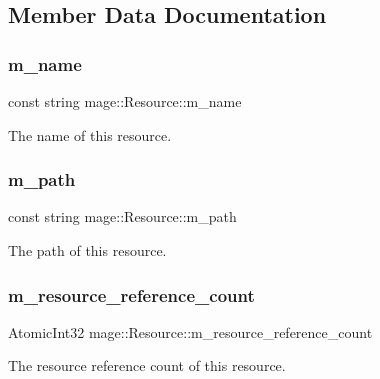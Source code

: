\subsection{Member Data Documentation}
\hypertarget{classmage_1_1_resource_a93019b74e9665195f1af17c60b6d171a}{}\label{classmage_1_1_resource_a93019b74e9665195f1af17c60b6d171a} 
\subsubsection{\texorpdfstring{m\+\_\+name}{m\_name}}
{\footnotesize\ttfamily const string mage\+::\+Resource\+::m\+\_\+name\hspace{0.3cm}{\ttfamily [private]}}

The name of this resource. \hypertarget{classmage_1_1_resource_a983470902250a8d16b6d5d01c332804b}{}\label{classmage_1_1_resource_a983470902250a8d16b6d5d01c332804b} 
\subsubsection{\texorpdfstring{m\+\_\+path}{m\_path}}
{\footnotesize\ttfamily const string mage\+::\+Resource\+::m\+\_\+path\hspace{0.3cm}{\ttfamily [private]}}

The path of this resource. \hypertarget{classmage_1_1_resource_aa71f1ecac3436591032d2abd6a2f5c37}{}\label{classmage_1_1_resource_aa71f1ecac3436591032d2abd6a2f5c37} 
\subsubsection{\texorpdfstring{m\+\_\+resource\+\_\+reference\+\_\+count}{m\_resource\_reference\_count}}
{\footnotesize\ttfamily Atomic\+Int32 mage\+::\+Resource\+::m\+\_\+resource\+\_\+reference\+\_\+count\hspace{0.3cm}{\ttfamily [private]}}

The resource reference count of this resource. 